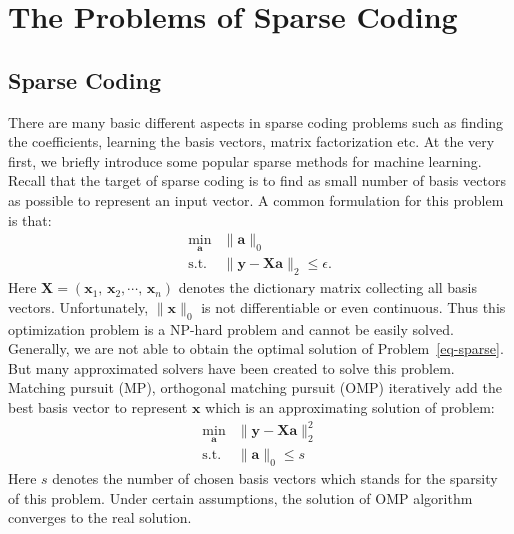 \section{The Problems of Sparse Coding}
\subsection{Sparse Coding}
There are many basic different aspects in sparse coding problems such as finding the coefficients, learning the basis vectors, matrix factorization etc.
At the very first, we briefly introduce some popular sparse methods for machine learning.
Recall that the target of sparse coding is to find as small number of basis vectors as possible to represent an input vector.
A common formulation for this problem is that:
\begin{equation}
\begin{array}{cl}
\min_{\mathbf{a}} & \|\mathbf{a}\|_0\\
\mathrm{s.t.} & \|\mathbf{y}-\mathbf{X}\mathbf{a}\|_2 \leq \epsilon.
\end{array}
\label{eq-sparse}
\end{equation}
Here $\mathbf{X}=(\mathbf{x}_1,\,\mathbf{x}_2,\cdots ,\,\mathbf{x}_n)$ denotes the dictionary matrix collecting all basis vectors.
Unfortunately, $\|\mathbf{x}\|_0$ is not differentiable or even continuous.
Thus this optimization problem is a NP-hard problem and cannot be easily solved.
Generally, we are not able to obtain the optimal solution of Problem~\ref{eq-sparse}.
But many approximated solvers have been created to solve this problem.
Matching pursuit (MP), orthogonal matching pursuit (OMP) iteratively add the best basis vector to represent $\mathbf{x}$ which is an approximating solution of problem:
\begin{equation}
\begin{array}{cl}
\min_{\mathbf{a}} & \|\mathbf{y}-\mathbf{X}\mathbf{a}\|_2^2 \\
\mathrm{s.t.} & \|\mathbf{a}\|_0 \leq s
\end{array}
\end{equation} 
Here $s$ denotes the number of chosen basis vectors which stands for the sparsity of this problem.
Under certain assumptions, the solution of OMP algorithm converges to the real solution.

